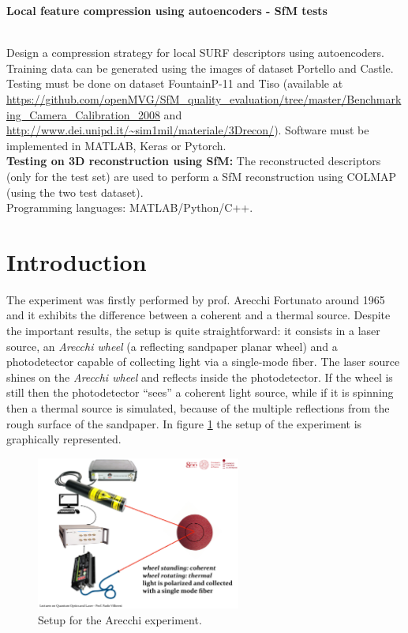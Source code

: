 
{\raggedright\large\textbf{Local feature compression using autoencoders - SfM tests}}\smallskip \\ 
Design a compression strategy for local SURF descriptors using autoencoders. Training data can be generated using the images of dataset Portello and Castle. Testing must be done on dataset FountainP-11 and Tiso (available at \url{https://github.com/openMVG/SfM_quality_evaluation/tree/master/Benchmarking_Camera_Calibration_2008} and \url{http://www.dei.unipd.it/~sim1mil/materiale/3Drecon/}). Software must be implemented in MATLAB, Keras or Pytorch. \\ \textbf{Testing on 3D reconstruction using SfM:} The reconstructed descriptors (only for the test set) are used to perform a SfM reconstruction using COLMAP (using the two test dataset). \\
Programming languages: MATLAB/Python/C++.

\section{Introduction}

The experiment was firstly performed by prof. Arecchi Fortunato around 1965 and it exhibits the difference between a coherent and a thermal source. Despite the important results, the setup is quite straightforward: it consists in a laser source, an \emph{Arecchi wheel} (a reflecting sandpaper planar wheel) and a photodetector capable of collecting light via a single-mode fiber. The laser source shines on the \emph{Arecchi wheel} and reflects inside the photodetector. If the wheel is still then the photodetector ``sees'' a coherent light source, while if it is spinning then a thermal source is simulated, because of the multiple reflections from the rough surface of the sandpaper. In figure \ref{fig:setup} the setup of the experiment is graphically represented.

\begin{figure}[h!]
    \centering
    \includegraphics[width=0.6\textwidth]{images/setup.pdf}
    \caption{Setup for the Arecchi experiment.}
    \label{fig:setup}    
\end{figure}

